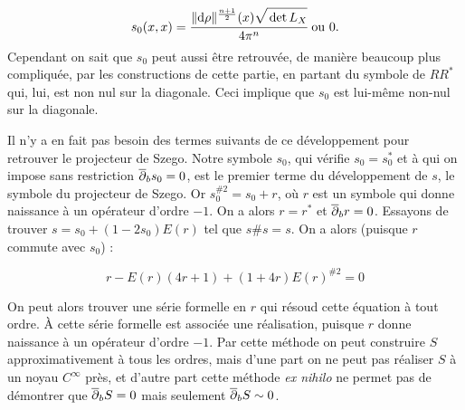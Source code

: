\begin{equation*}
  s_0(x,x) = \cfrac{\|\dd\rho\|^{\frac{n+1}{2}}(x)\sqrt{\vphantom{\hat{A}}\det L_X}}{4\pi^n} \text{ ou } 0.
\end{equation*}
Cependant on sait que $s_0$ peut aussi être retrouvée, de manière beaucoup plus compliquée, par les constructions de cette partie, en partant du symbole de $RR^*$ qui, lui, est non nul sur la diagonale. Ceci implique que $s_0$ est lui-même non-nul sur la diagonale.

Il n'y a en fait pas besoin des termes suivants de ce développement pour retrouver le projecteur de Szego. Notre symbole $s_0$, qui vérifie $s_0 = s_0^*$ et à qui on impose sans restriction $\overline{\partial}_b s_0=0$, est le premier terme du développement de $s$, le symbole du projecteur de Szego. Or $s_0^{\#2}=s_0+r$, où $r$ est un symbole qui donne naissance à un opérateur d'ordre $-1$. On a alors $r=r^*$ et $\overline{\partial}_b r=0$. Essayons de trouver $s=s_0+(1-2s_0)E(r)$ tel que $s\#s=s$. On a alors (puisque $r$ commute avec $s_0$) :

\begin{equation*}
  r-E(r)(4r+1)+(1 + 4r)E(r)^{\#2}= 0
\end{equation*}

On peut alors trouver une série formelle en $r$ qui résoud cette équation à tout ordre. À cette série formelle est associée une réalisation, puisque $r$ donne naissance à un opérateur d'ordre $-1$. Par cette méthode on peut construire $S$ approximativement à tous les ordres, mais d'une part on ne peut pas réaliser $S$ à un noyau $C^{\infty}$ près, et d'autre part cette méthode \emph{ex nihilo} ne permet pas de démontrer que $\overline{\partial}_b S=0$ mais seulement $\overline{\partial}_b S \sim 0$.
